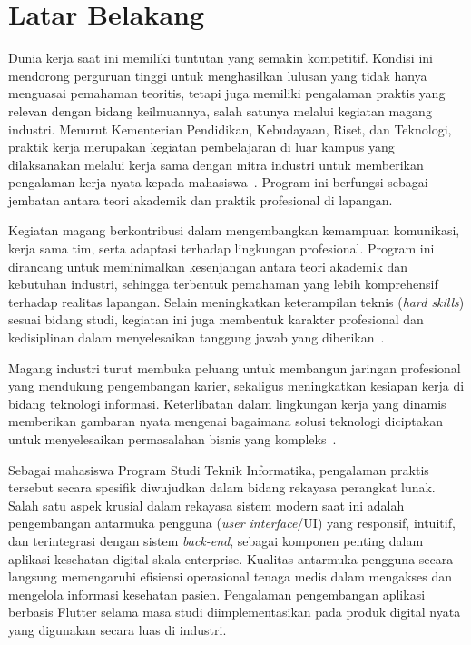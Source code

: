 \section{Latar Belakang}

Dunia kerja saat ini memiliki tuntutan yang semakin kompetitif. Kondisi ini
mendorong perguruan tinggi untuk menghasilkan lulusan yang tidak hanya
menguasai pemahaman teoritis, tetapi juga memiliki pengalaman praktis yang
relevan dengan bidang keilmuannya, salah satunya melalui kegiatan magang
industri. Menurut Kementerian Pendidikan, Kebudayaan, Riset, dan Teknologi,
praktik kerja merupakan kegiatan pembelajaran di luar kampus yang dilaksanakan
melalui kerja sama dengan mitra industri untuk memberikan pengalaman kerja
nyata kepada mahasiswa~\cite{Kemendikbud2023}. Program ini berfungsi sebagai
jembatan antara teori akademik dan praktik profesional di lapangan.

Kegiatan magang berkontribusi dalam mengembangkan kemampuan komunikasi, kerja
sama tim, serta adaptasi terhadap lingkungan profesional. Program ini dirancang
untuk meminimalkan kesenjangan antara teori akademik dan kebutuhan industri,
sehingga terbentuk pemahaman yang lebih komprehensif terhadap realitas
lapangan. Selain meningkatkan keterampilan teknis (\textit{hard skills}) sesuai
bidang studi, kegiatan ini juga membentuk karakter profesional dan kedisiplinan
dalam menyelesaikan tanggung jawab yang diberikan~\cite{Arisandi2022}.

Magang industri turut membuka peluang untuk membangun jaringan profesional yang
mendukung pengembangan karier, sekaligus meningkatkan kesiapan kerja di bidang
teknologi informasi. Keterlibatan dalam lingkungan kerja yang dinamis
memberikan gambaran nyata mengenai bagaimana solusi teknologi diciptakan untuk
menyelesaikan permasalahan bisnis yang kompleks~\cite{Arisandi2022}.

Sebagai mahasiswa Program Studi Teknik Informatika, pengalaman praktis tersebut
secara spesifik diwujudkan dalam bidang rekayasa perangkat lunak. Salah satu
aspek krusial dalam rekayasa sistem modern saat ini adalah pengembangan
antarmuka pengguna (\textit{user interface}/UI) yang responsif, intuitif, dan
terintegrasi dengan sistem \textit{back-end}, sebagai komponen penting dalam
aplikasi kesehatan digital skala enterprise. Kualitas antarmuka pengguna secara
langsung memengaruhi efisiensi operasional tenaga medis dalam mengakses dan
mengelola informasi kesehatan pasien. Pengalaman pengembangan aplikasi berbasis
Flutter selama masa studi diimplementasikan pada produk digital nyata yang
digunakan secara luas di industri.

